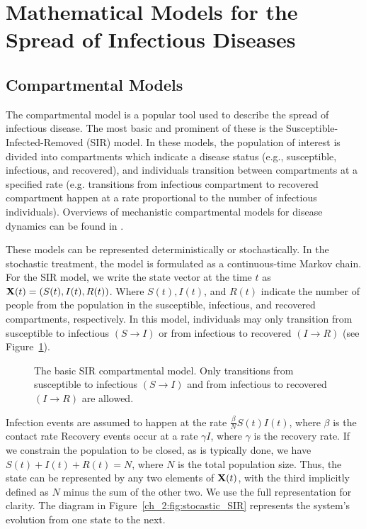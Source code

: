 \section{Mathematical Models for the Spread of Infectious Diseases}
\label{sec:math_models}

\subsection{Compartmental Models}

The compartmental model is a popular tool used to describe the spread of infectious disease.
The most basic and prominent of these is the Susceptible-Infected-Removed (SIR) model.
In these models, the population of interest is divided into compartments which indicate a disease status (e.g., susceptible, infectious, and recovered), and individuals transition between compartments at a specified rate
(e.g. transitions from infectious compartment to recovered compartment happen at a rate proportional to the number of infectious individuals).
Overviews of mechanistic compartmental models for disease dynamics can be found in \citet{anderson1992infectious, Brauer2008, keeling2011modeling, 10.1093/aje/kww021}.

These models can be represented deterministically or stochastically.
In the stochastic treatment, the model is formulated as a continuous-time Markov chain.
For the SIR model, we write the state vector at the time \( t \) as \( \mathbf{X}(t) = (S(t), I(t), R(t)) \).
Where \( S(t), I(t) \), and \( R(t) \) indicate the number of people from the population in the susceptible, infectious, and recovered compartments, respectively.
In this model, individuals may only transition from susceptible to infectious \( (S \to I) \) or from infectious to recovered \( (I \to R) \) (see Figure~\ref{fig:ch_2:SIR_diagram}).
\begin{figure}
    \centering
    \caption[The basic SIR compartmental model.]{The basic SIR compartmental model.
    Only transitions from susceptible to infectious \( (S \to I) \) and from infectious to recovered \( (I \to R) \) are allowed.}
    \label{fig:ch_2:SIR_diagram}
\end{figure}
Infection events are assumed to happen at the rate \( \frac{\beta}{N} S(t) I(t) \), where \( \beta \) is the contact rate
Recovery events occur at a rate \( \gamma I \), where \( \gamma \) is the recovery rate.
If we constrain the population to be closed, as is typically done, we have \(  S(t) + I(t) + R(t) = N \), where \( N \) is the total population size.
Thus, the state can be represented by any two elements of \( \mathbf{X} (t) \), with the third implicitly defined as \( N \) minus the sum of the other two.
We use the full representation for clarity.
The diagram in Figure~\ref{ch_2:fig:stocastic_SIR} represents the system's evolution from one state to the next.

